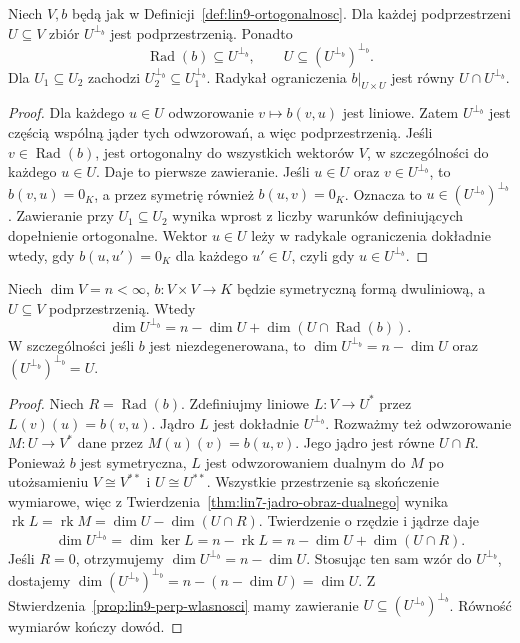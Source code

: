 \begin{stwierdzenie}
\label{prop:lin9-perp-wlasnosci}
Niech \(V,b\) będą jak w
Definicji~\ref{def:lin9-ortogonalnosc}.
Dla każdej podprzestrzeni
\(U\subseteq V\) zbiór
\(U^{\perp_b}\) jest podprzestrzenią.
Ponadto
\[
 \operatorname{Rad}(b)\subseteq U^{\perp_b},
 \qquad
 U\subseteq (U^{\perp_b})^{\perp_b}.
\]
Dla \(U_1\subseteq U_2\)
zachodzi
\(U_2^{\perp_b}\subseteq U_1^{\perp_b}\).
Radykał ograniczenia \(b|_{U\times U}\)
jest równy \(U\cap U^{\perp_b}\).
\end{stwierdzenie}
\begin{proof}
Dla każdego \(u\in U\)
odwzorowanie \(v\mapsto b(v,u)\)
jest liniowe. Zatem
\(U^{\perp_b}\) jest częścią wspólną
jąder tych odwzorowań, a więc
podprzestrzenią.
Jeśli \(v\in\operatorname{Rad}(b)\),
jest ortogonalny do wszystkich
wektorów \(V\), w szczególności
do każdego \(u\in U\).
Daje to pierwsze zawieranie.
Jeśli \(u\in U\) oraz
\(v\in U^{\perp_b}\), to
\(b(v,u)=0_K\), a przez
symetrię również \(b(u,v)=0_K\).
Oznacza to \(u\in
(U^{\perp_b})^{\perp_b}\).
Zawieranie przy \(U_1\subseteq U_2\)
wynika wprost z liczby
warunków definiujących
dopełnienie ortogonalne.
Wektor \(u\in U\) leży
w radykale ograniczenia
dokładnie wtedy, gdy
\(b(u,u')=0_K\) dla każdego
\(u'\in U\), czyli gdy
\(u\in U^{\perp_b}\).
\end{proof}

\begin{twierdzenie}
\label{thm:lin9-perp-wymiar}
Niech \(\dim V=n<\infty\),
\(b\colon V\times V\to K\)
będzie symetryczną formą
dwuliniową, a \(U\subseteq V\)
podprzestrzenią.
Wtedy
\[
 \dim U^{\perp_b}
 =n-\dim U+\dim(U\cap\operatorname{Rad}(b)).
\]
W szczególności jeśli \(b\)
jest niezdegenerowana, to
\(\dim U^{\perp_b}=n-\dim U\)
oraz
\((U^{\perp_b})^{\perp_b}=U\).
\end{twierdzenie}
\begin{proof}
Niech \(R=\operatorname{Rad}(b)\).
Zdefiniujmy liniowe
\(L\colon V\to U^*\)
przez
\(L(v)(u)=b(v,u)\).
Jądro \(L\) jest dokładnie
\(U^{\perp_b}\).
Rozważmy też odwzorowanie
\(M\colon U\to V^*\)
dane przez \(M(u)(v)=b(u,v)\).
Jego jądro jest równe \(U\cap R\).
Ponieważ \(b\) jest symetryczna,
\(L\) jest odwzorowaniem dualnym
do \(M\) po utożsamieniu
\(V\cong V^{**}\) i \(U\cong U^{**}\).
Wszystkie przestrzenie są
skończenie wymiarowe, więc
z
Twierdzenia~\ref{thm:lin7-jadro-obraz-dualnego}
wynika
\(\operatorname{rk}L
=\operatorname{rk}M
=\dim U-\dim(U\cap R)\).
Twierdzenie o rzędzie i jądrze
daje
\[
 \dim U^{\perp_b}
 =\dim\ker L
 =n-\operatorname{rk}L
 =n-\dim U+\dim(U\cap R).
\]
Jeśli \(R=0\), otrzymujemy
\(\dim U^{\perp_b}=n-\dim U\).
Stosując ten sam wzór do
\(U^{\perp_b}\), dostajemy
\(\dim (U^{\perp_b})^{\perp_b}
=n-(n-\dim U)=\dim U\).
Z
Stwierdzenia~\ref{prop:lin9-perp-wlasnosci}
mamy zawieranie
\(U\subseteq (U^{\perp_b})^{\perp_b}\).
Równość wymiarów kończy dowód.
\end{proof}

